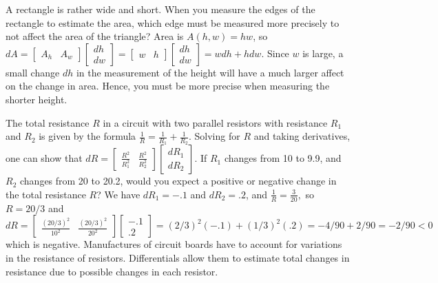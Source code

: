\begin{example}
A rectangle is rather wide and short.  When you measure the edges of
the rectangle to estimate the area, which edge must be measured more
precisely to not affect the area of the triangle?  Area is
$A(h,w)=hw$, so $dA =
\begin{bmatrix}A_h&A_w\end{bmatrix}\begin{bmatrix}dh\\dw\end{bmatrix}
= \begin{bmatrix}w&h\end{bmatrix}\begin{bmatrix}dh\\dw\end{bmatrix} =
wdh+hdw$. Since $w$ is large, a small change $dh$ in the measurement
of the height will have a much larger affect on the change in area. 
Hence, you must be more precise when measuring the shorter height.
\end{example}

\begin{example}
The total resistance {$R$} in a circuit with two parallel resistors
with resistance {$R_1$} and {$R_2$} is given by the formula {$
\frac{1}{R} = \frac{1}{R_1}+\frac{1}{R_2} $}.  Solving for $R$ and
taking derivatives, one can show that {$ dR =
\begin{bmatrix}\frac{R^2}{R_1^2} & \frac{R^2}{R_2^2} \end{bmatrix}
\begin{bmatrix}dR_1\\dR_2\end{bmatrix}$}. If {$ R_1 $} changes from 10
to 9.9, and {$ R_2 $} changes from 20 to 20.2, would you expect a
positive or negative change in the total resistance {$R$}? We have
$dR_1 = -.1$ and $dR_2=.2$, and $\frac{1}{R} = \frac{3}{20},$ so
$R=20/3$ and $dR = \begin{bmatrix}\frac{(20/3)^2}{10^2} &
\frac{(20/3)^2}{20^2} \end{bmatrix}
\begin{bmatrix}-.1\\.2\end{bmatrix} = 
(2/3)^2(-.1) + (1/3)^2(.2) = -4/90+2/90=-2/90<0$ which is negative.
Manufactures of circuit boards have to account for variations in the
resistance of resistors.  Differentials allow them to estimate total
changes in resistance due to possible changes in each resistor. 
\end{example}

